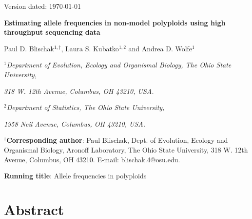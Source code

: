 \documentclass[11pt,english,letterpaper,oneside]{article}
\begin{document}
\newcommand{\tmat}{$\bm{T}$}
\newcommand{\rmat}{$\bm{R}$}
\newcommand{\etal}{\textit{et al}.}

\hfill Version dated: \mydate\today
\vspace{0.25in}

\begin{center}

{\LARGE \bfseries Estimating allele frequencies in non-model polyploids using high throughput sequencing data}
\vspace{0.45in}

Paul D. Blischak$^{1,\dagger}$, Laura S. Kubatko$^{1,2}$ and Andrea D. Wolfe$^1$
\vspace{0.45in}


\textit{$^1$Department of Evolution, Ecology and Organismal Biology, The Ohio State University,}

\textit{318 W. 12th Avenue, Columbus, OH 43210, USA.}
\bigskip
\bigskip

\textit{$^2$Department of Statistics, The Ohio State University,}

\textit{1958 Neil Avenue, Columbus, OH 43210, USA.}


\end{center}
\vspace{0.45in}


\noindent $^\dagger$\textbf{Corresponding author}: Paul Blischak, Dept. of Evolution, Ecology and Organismal Biology, Aronoff Laboratory, The Ohio State University, 318 W. 12th Avenue, Columbus, OH 43210. E-mail: blischak.4@osu.edu.

\vspace{0.45in}

\noindent \textbf{Running title}: Allele frequencies in polyploids

\vspace{.45in}

\section*{Abstract}                      %
\end{document}
